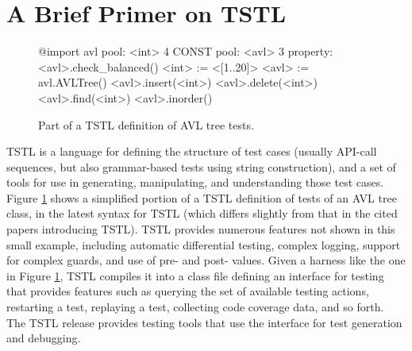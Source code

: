 \section{A Brief Primer on TSTL}

\begin{figure}
{\scriptsize
\begin{code}
@import avl
\vspace{0.05in}
pool: <int> 4 CONST
pool: <avl> 3
\vspace{0.05in}
property: <avl>.check\_balanced()
\vspace{0.05in}
<int> := <[1..20]>
<avl> := avl.AVLTree()
\vspace{0.05in}
<avl>.insert(<int>)
<avl>.delete(<int>)
<avl>.find(<int>)
<avl>.inorder()
\end{code}
}
\caption{Part of a TSTL definition of AVL tree tests.}
\label{fig:example}
\end{figure}


TSTL \cite{NFM15,ISSTA15,TSTL} is a language for defining the structure of
test cases (usually API-call sequences, but also grammar-based tests using
string construction), and a set of tools for use in generating,
manipulating, and understanding those test cases.  Figure
\ref{fig:example} shows a simplified portion of a TSTL definition of
tests of an AVL tree class, in the latest syntax for TSTL (which
differs slightly from that in the cited papers introducing TSTL).
TSTL provides numerous features not shown in this small example,
including automatic differential testing, complex logging, support for
complex guards, and use of pre- and post- values.  Given a harness
like the one in Figure \ref{fig:example}, TSTL compiles it into a
class file defining an interface for testing that provides features
such as querying the set of available testing actions, restarting a
test, replaying a test, collecting code coverage data, and so forth.
The TSTL release \cite{tstl} provides testing tools that use the
interface for test generation and debugging.


